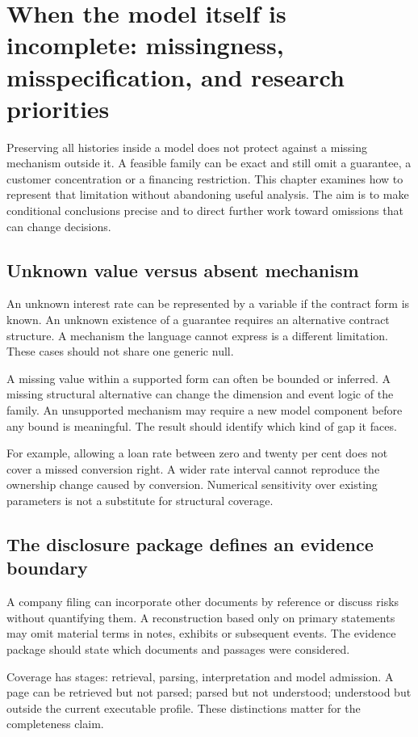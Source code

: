 \chapter[When the model itself is incomplete]{When the model itself is incomplete: missingness, misspecification, and research priorities}
\label{sim:model-risk}

Preserving all histories inside a model does not protect against a missing mechanism outside it. A feasible family can be exact and still omit a guarantee, a customer concentration or a financing restriction. This chapter examines how to represent that limitation without abandoning useful analysis. The aim is to make conditional conclusions precise and to direct further work toward omissions that can change decisions.

\section{Unknown value versus absent mechanism}
An unknown interest rate can be represented by a variable if the contract form is known. An unknown existence of a guarantee requires an alternative contract structure. A mechanism the language cannot express is a different limitation. These cases should not share one generic null.

A missing value within a supported form can often be bounded or inferred. A missing structural alternative can change the dimension and event logic of the family. An unsupported mechanism may require a new model component before any bound is meaningful. The result should identify which kind of gap it faces.

For example, allowing a loan rate between zero and twenty per cent does not cover a missed conversion right. A wider rate interval cannot reproduce the ownership change caused by conversion. Numerical sensitivity over existing parameters is not a substitute for structural coverage.

\section{The disclosure package defines an evidence boundary}
A company filing can incorporate other documents by reference or discuss risks without quantifying them. A reconstruction based only on primary statements may omit material terms in notes, exhibits or subsequent events. The evidence package should state which documents and passages were considered.

Coverage has stages: retrieval, parsing, interpretation and model admission. A page can be retrieved but not parsed; parsed but not understood; understood but outside the current executable profile. These distinctions matter for the completeness claim.

